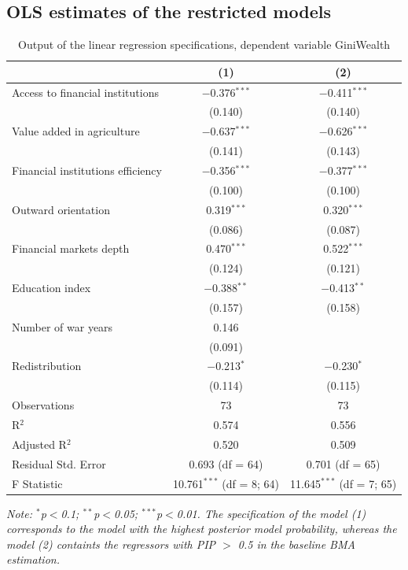 \begin{refsection}
\begin{subappendices}
    \section{\ac{OLS} estimates of the restricted models}
    \begin{table}[!htbp] 
    \centering 
    \caption{Output of the linear regression specifications, dependent variable GiniWealth} 
    \label{ch3res:ols}
    \begin{threeparttable}
    \begin{tabular}{@{\extracolsep{5pt}}lcc} 
    \toprule
      & (1) & (2) \\ 
    \midrule
     Access to financial institutions & $-$0.376$^{***}$ & $-$0.411$^{***}$ \\ 
      & (0.140) & (0.140) \\ 
     Value added in agriculture & $-$0.637$^{***}$ & $-$0.626$^{***}$ \\ 
      & (0.141) & (0.143) \\ 
     Financial institutions efficiency & $-$0.356$^{***}$ & $-$0.377$^{***}$ \\ 
      & (0.100) & (0.100) \\ 
     Outward orientation & 0.319$^{***}$ & 0.320$^{***}$ \\ 
      & (0.086) & (0.087) \\ 
     Financial markets depth & 0.470$^{***}$ & 0.522$^{***}$ \\ 
      & (0.124) & (0.121) \\ 
     Education index & $-$0.388$^{**}$ & $-$0.413$^{**}$ \\ 
      & (0.157) & (0.158) \\ 
     Number of war years & 0.146 &  \\ 
      & (0.091) &  \\ 
     Redistribution & $-$0.213$^{*}$ & $-$0.230$^{*}$ \\ 
      & (0.114) & (0.115) \\ 
    \midrule 
    Observations & 73 & 73 \\ 
    R$^{2}$ & 0.574 & 0.556 \\ 
    Adjusted R$^{2}$ & 0.520 & 0.509 \\ 
    Residual Std. Error & 0.693 (df = 64) & 0.701 (df = 65) \\ 
    F Statistic & 10.761$^{***}$ (df = 8; 64) & 11.645$^{***}$ (df = 7; 65) \\
    \bottomrule
    \end{tabular}
    \begin{tablenotes}
    \footnotesize
    \item \textit{Note: {$^{*}$p$<$0.1; $^{**}$p$<$0.05; $^{***}$p$<$0.01.} The specification of the model (1) corresponds to the model with the highest posterior model probability, whereas the model (2) containts the regressors with \ac{PIP} $>$ 0.5 in the baseline \ac{BMA} estimation.}
    \end{tablenotes}
    \end{threeparttable}
    \end{table}
    \clearpage
    

\end{subappendices}
\end{refsection}
